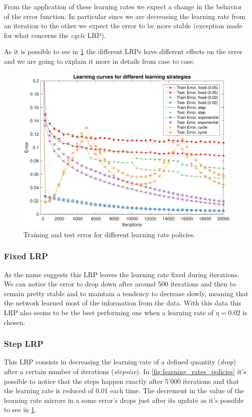 From the application of these learning rates we expect a change in the behavior of the error function. In particular
since we are decreasing the learning rate from an iteration to the other we expect the error to be more stable (exception made
for what concerns the \textit{cycle} LRP).

As it is possible to see in \cref{fig:lrp_training_error} the different LRPs have different
effects on the error and we are going to explain it more in details from case to case.

\begin{figure}
	\centering
	\includegraphics[width=\columnwidth]{figures/error_strategies.pdf}
	\caption{Training and test error for different learning rate policies.}
	\label{fig:lrp_training_error}
\end{figure}

\subsubsection{Fixed LRP}
As the name suggests this LRP leaves the learning rate fixed during iterations. We can notice the error to drop down after around 500 iterations and then
to remain pretty stable and to maintain a tendency to decrease slowly, meaning that the network learned most
of the information from the data. With this data this LRP also seems to be the best performing one when a learning rate of $\eta = 0.02$ is chosen.

\subsubsection{Step LRP}
This LRP consists in decreasing the learning rate of a defined quantity (\textit{drop}) after a certain number of iterations
(\textit{stepsize}). In \cref{fig:learning_rates_policies} it's possible to notice that the steps happen exactly after 5'000 iterations and that
the learning rate is reduced of $0.01$ each time.
The decrement in the value of the learning rate mirrors in a some error's drops just after its update as it's possible to see in \cref{fig:lrp_training_error}.

